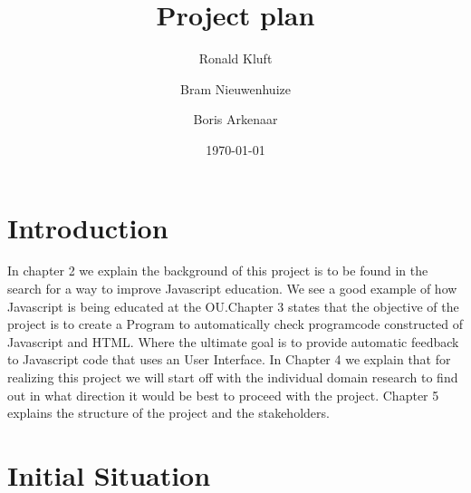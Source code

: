 \documentclass{article}
\begin{document}
\title{Project plan}
\author{Ronald Kluft \and Bram Nieuwenhuize \and Boris Arkenaar}
\date{\today}
\maketitle

\section{Introduction}


In chapter 2 we explain the background of this project is to be found in the search for a way to improve Javascript education. We see a good example of how Javascript is being educated at the OU.Chapter 3 states that the objective of the project is to create a Program to automatically check programcode constructed of Javascript and HTML.
Where the ultimate goal is to provide automatic feedback to Javascript code that uses an User Interface. In Chapter 4 we explain that for realizing this project we will start off with the individual domain research to find out in what direction it would be best to proceed with the project. Chapter 5 explains the structure of the project and the stakeholders.

\section{Initial Situation}
\end{document}
